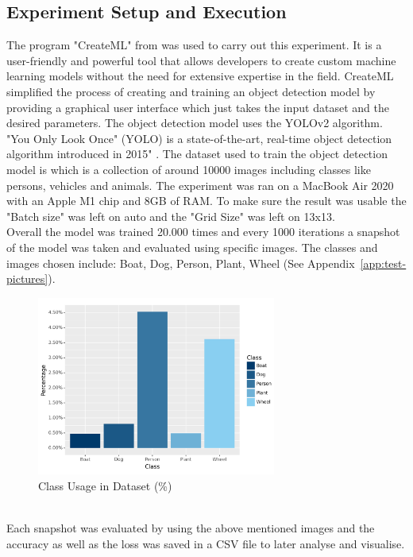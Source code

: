 \subsection{Experiment Setup and Execution}
The program "CreateML" from \cite{Apple} was used to carry out this experiment. It is a user-friendly and powerful 
tool that allows developers to create custom machine learning models without the need for extensive expertise in the field.
CreateML simplified the process of creating and training an object detection model by providing a graphical user interface which 
just takes the input dataset and the desired parameters. The object detection model uses the YOLOv2 \parencite{Jaina} algorithm.
"You Only Look Once" (YOLO) is a state-of-the-art, real-time object detection algorithm introduced in 2015" \parencite{Keita2022}. 
The dataset used to train the object detection model is  which is a collection of around 10000 images including classes
like persons, vehicles and animals. The experiment was ran on a MacBook Air 2020 with an Apple M1 chip and 8GB of RAM. To make sure the 
result was usable the "Batch size" was left on auto and the "Grid Size" was left on 13x13.\\
\newpage
Overall the model was trained 20.000 times and every 1000 iterations a snapshot of the model was taken and evaluated using
specific images. 
The classes and images chosen include: Boat, Dog, Person, Plant, Wheel (See Appendix~\ref{app:test-pictures}).
\begin{figure}[h]
  \centering
  \includegraphics[width=0.70\textwidth]{../Data/distribution-classes-barchart.png}
  \caption{Class Usage in Dataset (\%)}
  \label{fig:class-usage-in-dataset}
\end{figure}
\\
Each snapshot was evaluated by using the above mentioned images and the accuracy as well as the loss was saved in a CSV file to later 
analyse and visualise.
\\
